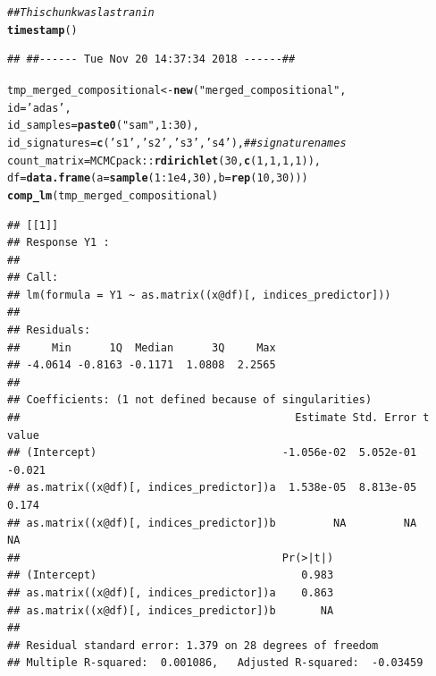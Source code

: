 \documentclass{article}\usepackage[]{graphicx}\usepackage[]{color}
\makeatletter
\newcommand{\hlnum}[1]{\textcolor[rgb]{0.686,0.059,0.569}{#1}}%
\newcommand{\hlstr}[1]{\textcolor[rgb]{0.192,0.494,0.8}{#1}}%
\newcommand{\hlcom}[1]{\textcolor[rgb]{0.678,0.584,0.686}{\textit{#1}}}%
\newcommand{\hlopt}[1]{\textcolor[rgb]{0,0,0}{#1}}%
\newcommand{\hlstd}[1]{\textcolor[rgb]{0.345,0.345,0.345}{#1}}%
\newcommand{\hlkwb}[1]{\textcolor[rgb]{0.69,0.353,0.396}{#1}}%
\newcommand{\hlkwc}[1]{\textcolor[rgb]{0.333,0.667,0.333}{#1}}%
\newcommand{\hlkwd}[1]{\textcolor[rgb]{0.737,0.353,0.396}{\textbf{#1}}}%
\newenvironment{kframe}{%
 \def\at@end@of@kframe{}%
 \ifinner\ifhmode%
  \def\at@end@of@kframe{\end{minipage}}%
  \begin{minipage}{\columnwidth}%
 \fi\fi%
 \def\FrameCommand##1{\hskip\@totalleftmargin \hskip-\fboxsep
 \colorbox{shadecolor}{##1}\hskip-\fboxsep
     \hskip-\linewidth \hskip-\@totalleftmargin \hskip\columnwidth}%
 \MakeFramed {\advance\hsize-\width
   \@totalleftmargin\z@ \linewidth\hsize
   \@setminipage}}%
 {\par\unskip\endMakeFramed%
 \at@end@of@kframe}
\newenvironment{knitrout}{}{} %
\makeatother
\begin{document}
\begin{knitrout}
\color{fgcolor}\begin{kframe}
\begin{alltt}
\hlcom{## This chunk was last ran in}
\hlkwd{timestamp}\hlstd{()}
\end{alltt}
\begin{verbatim}
## ##------ Tue Nov 20 14:37:34 2018 ------##
\end{verbatim}
\begin{alltt}
\hlstd{tmp_merged_compositional} \hlkwb{<-} \hlkwd{new}\hlstd{(}\hlstr{"merged_compositional"}\hlstd{,}
                                \hlkwc{id}\hlstd{=}\hlstr{'adas'}\hlstd{,}
                                \hlkwc{id_samples}\hlstd{=}\hlkwd{paste0}\hlstd{(}\hlstr{"sam"}\hlstd{,} \hlnum{1}\hlopt{:}\hlnum{30}\hlstd{),}
                                \hlkwc{id_signatures}\hlstd{=} \hlkwd{c}\hlstd{(}\hlstr{'s1'}\hlstd{,} \hlstr{'s2'}\hlstd{,} \hlstr{'s3'}\hlstd{,} \hlstr{'s4'}\hlstd{),} \hlcom{## signature names}
                                \hlkwc{count_matrix}\hlstd{=MCMCpack}\hlopt{::}\hlkwd{rdirichlet}\hlstd{(}\hlnum{30}\hlstd{,} \hlkwd{c}\hlstd{(}\hlnum{1}\hlstd{,}\hlnum{1}\hlstd{,}\hlnum{1}\hlstd{,}\hlnum{1}\hlstd{)),}
                                \hlkwc{df}\hlstd{=}\hlkwd{data.frame}\hlstd{(}\hlkwc{a}\hlstd{=}\hlkwd{sample}\hlstd{(}\hlnum{1}\hlopt{:}\hlnum{1e4}\hlstd{,} \hlnum{30}\hlstd{),} \hlkwc{b}\hlstd{=}\hlkwd{rep}\hlstd{(}\hlnum{10}\hlstd{,} \hlnum{30}\hlstd{)))}
\hlkwd{comp_lm}\hlstd{(tmp_merged_compositional)}
\end{alltt}
\begin{verbatim}
## [[1]]
## Response Y1 :
## 
## Call:
## lm(formula = Y1 ~ as.matrix((x@df)[, indices_predictor]))
## 
## Residuals:
##     Min      1Q  Median      3Q     Max 
## -4.0614 -0.8163 -0.1171  1.0808  2.2565 
## 
## Coefficients: (1 not defined because of singularities)
##                                           Estimate Std. Error t value
## (Intercept)                             -1.056e-02  5.052e-01  -0.021
## as.matrix((x@df)[, indices_predictor])a  1.538e-05  8.813e-05   0.174
## as.matrix((x@df)[, indices_predictor])b         NA         NA      NA
##                                         Pr(>|t|)
## (Intercept)                                0.983
## as.matrix((x@df)[, indices_predictor])a    0.863
## as.matrix((x@df)[, indices_predictor])b       NA
## 
## Residual standard error: 1.379 on 28 degrees of freedom
## Multiple R-squared:  0.001086,	Adjusted R-squared:  -0.03459 

\end{verbatim}
\end{kframe}
\end{knitrout}
\end{document}

